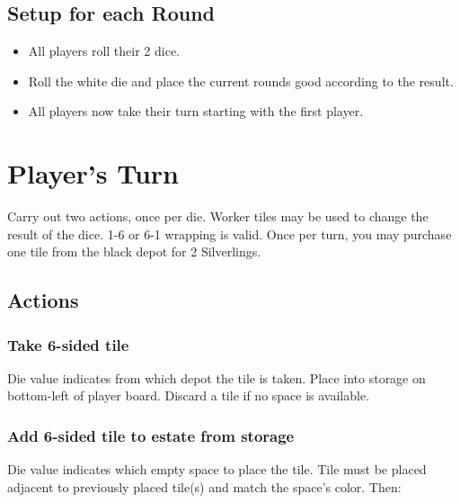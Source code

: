 \documentclass[12pt]{article}
\newenvironment{itemizeCustom}
{\begin{itemize}
  \setlength{\itemsep}{1pt}
  \setlength{\parskip}{0pt}
  \setlength{\parsep}{0pt}}
{\end{itemize}}
\begin{document}
\begin{multicols*}{2}
\subsection*{Setup for each Round}
\begin{itemizeCustom}
	\item All players roll their 2 dice.
	\item Roll the white die and place the current rounds good according to the result.
	\item All players now take their turn starting with the first player.
\end{itemizeCustom}

\section*{Player's Turn}
Carry out two actions, once per die. Worker tiles may be used to change the result of the dice. 1-6 or 6-1 wrapping is valid. Once per turn, you may purchase one tile from the black depot for 2 Silverlings.

\subsection*{Actions}
\subsubsection*{Take 6-sided tile}
Die value indicates from which depot the tile is taken. Place into storage on bottom-left of player board. Discard a tile if no space is available.

\subsubsection*{Add 6-sided tile to estate from storage}
Die value indicates which empty space to place the tile. Tile must be placed adjacent to previously placed tile(s) and match the space's color. Then:


\end{multicols*}
\end{document}
